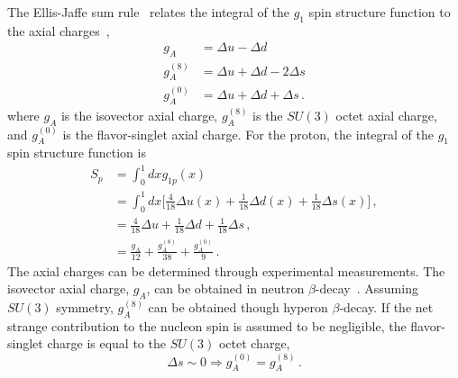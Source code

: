   The Ellis-Jaffe sum rule~\cite{Ellis:1973kp} relates the integral of the
  $g_1$ spin structure function to the axial charges~\cite{Thomas:2001kw},
  \begin{align}
    g_A &= \Delta u - \Delta d \\
    g_A^{(8)} &= \Delta u + \Delta d - 2\Delta s \\
    g_A^{(0)} &= \Delta u + \Delta d + \Delta s \,.
  \end{align}
  where $g_A$ is the isovector axial charge, $g_A^{(8)}$ is the $SU(3)$ octet
  axial charge, and $g_A^{(0)}$ is the flavor-singlet axial charge. For the
  proton, the integral of the $g_1$ spin structure function is
  \begin{equation}
    \begin{aligned}
    S_p &= \int_0^1 dx g_{1p}(x)  \\
        &= \int_0^1 dx \Big[\frac{4}{18}\Delta u(x) 
        + \frac{1}{18} \Delta d(x) + \frac{1}{18} \Delta s(x) \Big] \,, \\
        &= \frac{4}{18}\Delta u + \frac{1}{18}\Delta d + \frac{1}{18}\Delta s \,, \\
        &= \frac{g_A}{12} + \frac{g_A^{(8)}}{38} + \frac{g_A^{(0)}}{9} \,.
    \end{aligned}
  \end{equation}
  The axial charges can be determined through experimental measurements.  The
  isovector axial charge, $g_A$, can be obtained in neutron
  $\beta$-decay~\cite{Dubbers:1991bh}. Assuming $SU(3)$ symmetry, $g_A^{(8)}$
  can be obtained though hyperon $\beta$-decay. If the net strange contribution
  to the nucleon spin is assumed to be negligible, the flavor-singlet charge is
  equal to the $SU(3)$ octet charge,
  \begin{equation}
     \Delta s \sim 0 \Rightarrow g_A^{(0)} = g_A^{(8)} \,.
  \end{equation}

